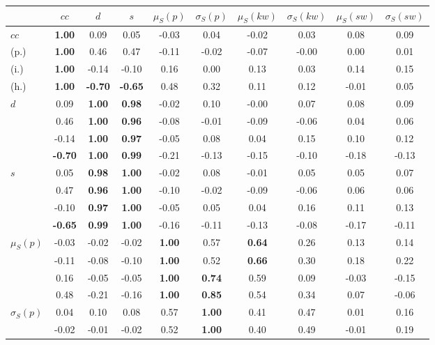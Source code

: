 \begin{table*}[h!]
\begin{center}
\begin{tabular}{| l || c | c | c | c | c | c | c | c | c |}\hline
 & $cc$ & $d$ & $s$ & $\mu_S(p)$ & $\sigma_S(p)$ & $\mu_S(kw)$ & $\sigma_S(kw)$ & $\mu_S(sw)$ & $\sigma_S(sw)$ \\\hline\hline
$cc$ & {\bf 1.00} & 0.09 & 0.05 & -0.03 & 0.04 & -0.02 & 0.03 & 0.08 & 0.09 \\
(p.) & {\bf 1.00} & 0.46 & 0.47 & -0.11 & -0.02 & -0.07 & -0.00 & 0.00 & 0.01 \\
(i.) & {\bf 1.00} & -0.14 & -0.10 & 0.16 & 0.00 & 0.13 & 0.03 & 0.14 & 0.15 \\
(h.) & {\bf 1.00} & {\bf -0.70} & {\bf -0.65} & 0.48 & 0.32 & 0.11 & 0.12 & -0.01 & 0.05 \\\hline
$d$ & 0.09 & {\bf 1.00} & {\bf 0.98} & -0.02 & 0.10 & -0.00 & 0.07 & 0.08 & 0.09 \\
 & 0.46 & {\bf 1.00} & {\bf 0.96} & -0.08 & -0.01 & -0.09 & -0.06 & 0.04 & 0.06 \\
 & -0.14 & {\bf 1.00} & {\bf 0.97} & -0.05 & 0.08 & 0.04 & 0.15 & 0.10 & 0.12 \\
 & {\bf -0.70} & {\bf 1.00} & {\bf 0.99} & -0.21 & -0.13 & -0.15 & -0.10 & -0.18 & -0.13 \\\hline
$s$ & 0.05 & {\bf 0.98} & {\bf 1.00} & -0.02 & 0.08 & -0.01 & 0.05 & 0.05 & 0.07 \\
 & 0.47 & {\bf 0.96} & {\bf 1.00} & -0.10 & -0.02 & -0.09 & -0.06 & 0.06 & 0.06 \\
 & -0.10 & {\bf 0.97} & {\bf 1.00} & -0.05 & 0.05 & 0.04 & 0.16 & 0.11 & 0.13 \\
 & {\bf -0.65} & {\bf 0.99} & {\bf 1.00} & -0.16 & -0.11 & -0.13 & -0.08 & -0.17 & -0.11 \\\hline
$\mu_S(p)$ & -0.03 & -0.02 & -0.02 & {\bf 1.00} & 0.57 & {\bf 0.64} & 0.26 & 0.13 & 0.14 \\
 & -0.11 & -0.08 & -0.10 & {\bf 1.00} & 0.52 & {\bf 0.66} & 0.30 & 0.18 & 0.22 \\
 & 0.16 & -0.05 & -0.05 & {\bf 1.00} & {\bf 0.74} & 0.59 & 0.09 & -0.03 & -0.15 \\
 & 0.48 & -0.21 & -0.16 & {\bf 1.00} & {\bf 0.85} & 0.54 & 0.34 & 0.07 & -0.06 \\\hline
$\sigma_S(p)$ & 0.04 & 0.10 & 0.08 & 0.57 & {\bf 1.00} & 0.41 & 0.47 & 0.01 & 0.16 \\
 & -0.02 & -0.01 & -0.02 & 0.52 & {\bf 1.00} & 0.40 & 0.49 & -0.01 & 0.19 \\

\end{tabular}
\end{center}
\end{table*}
